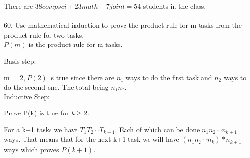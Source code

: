 \documentclass[12]{article}
\begin{document}
There are $38 comp sci + 23 math - 7 joint = 54$ students in the class.\\

\hrulefill\\

60. Use mathematical induction to prove the product rule for m tasks from the product rule
for two tasks.\\

$P(m)$ is the product rule for m tasks.

Basis step:

m = 2, $P(2)$ is true since there are $n_1$ ways to do the first task and $n_2$ ways to do the second one.  The total being $n_1n_2$.\\

Inductive Step:

Prove P(k) is true for $k \geq 2$.

For a k+1 tasks we have $T_1T_2 \cdot\cdot T_{k+1}$.  Each of which can be done $n_1n_2 \cdot\cdot n_{k+1}$ ways. That means that for the next k+1 task we will have $(n_1n_2 \cdot\cdot n_{k})*n_{k+1}$ ways which proves $P(k+1)$.
\end{document}
